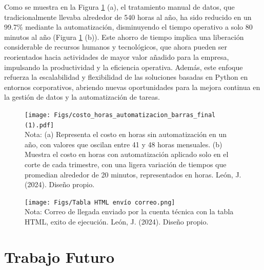 \documentclass[letter,oneside,12pt,spanish]{report}
\begin{document}
\noindent Como se muestra en la Figura \ref{fig:ConvsSinAutomatizacion} (a), el tratamiento manual de datos, que tradicionalmente llevaba alrededor de 540 horas al año, ha sido reducido en un 99.7\% mediante la automatización, disminuyendo el tiempo operativo a solo 80 minutos al año (Figura \ref{fig:ConvsSinAutomatizacion} (b)). Este ahorro de tiempo implica una liberación considerable de recursos humanos y tecnológicos, que ahora pueden ser reorientados hacia actividades de mayor valor añadido para la empresa, impulsando la productividad y la eficiencia operativa. Además, este enfoque refuerza la escalabilidad y flexibilidad de las soluciones basadas en Python en entornos corporativos, abriendo nuevas oportunidades para la mejora continua en la gestión de datos y la automatización de tareas.

\begin{figure}[ht]
    \centering
    \texttt{[image: Figs/costo\_horas\_automatizacion\_barras\_final (1).pdf]}
    \label{fig:ConvsSinAutomatizacion}
    \\Nota: (a) Representa el costo en horas sin automatización en un año, con valores que oscilan entre 41 y 48 horas mensuales. (b) Muestra el costo en horas con automatización aplicado solo en el corte de cada trimestre, con una ligera variación de tiempos que promedian alrededor de 20 minutos, representados en horas. León, J. (2024). Diseño propio.
\end{figure}

\begin{figure}[ht]
    \centering
    \texttt{[image: Figs/Tabla HTML envío correo.png]}
    \label{fig:HTMLSend}
    \\Nota: Correo de llegada enviado por la cuenta técnica con la tabla HTML, exito de ejecución. León, J. (2024). Diseño propio.
\end{figure} 




\newpage

\section{Trabajo Futuro}
\end{document}
